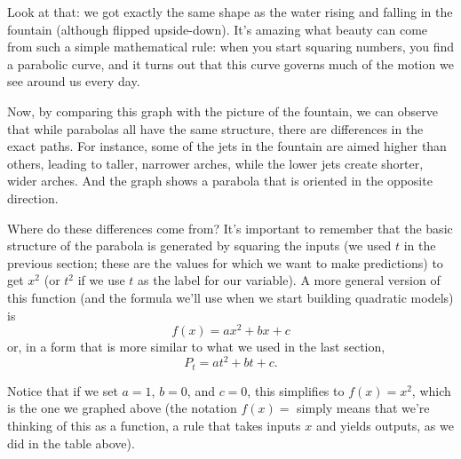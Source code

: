 \begin{center}
\end{center}

Look at that: we got exactly the same shape as the water rising and falling in the fountain (although flipped upside-down).  It's amazing what beauty can come from such a simple mathematical rule: when you start squaring numbers, you find a parabolic curve, and it turns out that this curve governs much of the motion we see around us every day.

Now, by comparing this graph with the picture of the fountain, we can observe that while parabolas all have the same structure, there are differences in the exact paths.  For instance, some of the jets in the fountain are aimed higher than others, leading to taller, narrower arches, while the lower jets create shorter, wider arches.  And the graph shows a parabola that is oriented in the opposite direction.

Where do these differences come from?  It's important to remember that the basic structure of the parabola is generated by squaring the inputs (we used $t$ in the previous section; these are the values for which we want to make predictions) to get $x^2$ (or $t^2$ if we use $t$ as the label for our variable).  A more general version of this function (and the formula we'll use when we start building quadratic models) is
\[f(x) = ax^2 + bx + c\]
or, in a form that is more similar to what we used in the last section,
\[P_t = at^2 + bt + c.\]

Notice that if we set $a=1$, $b=0$, and $c=0$, this simplifies to $f(x) = x^2$, which is the one we graphed above (the notation $f(x)=$ simply means that we're thinking of this as a function, a rule that takes inputs $x$ and yields outputs, as we did in the table above).
\vfill
\pagebreak

